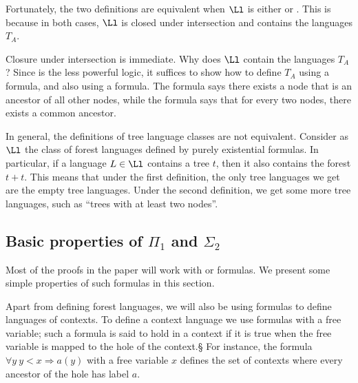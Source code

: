\documentclass{LMCS}
\begin{document}
Fortunately, the two  definitions are equivalent when $\Ll$ is either \Dtwo or \Dtwol. This is because in both cases,   $\Ll$ is closed under intersection and contains the languages  $T_A$.  

Closure under intersection is immediate. Why does $\Ll$ contain the languages $T_A$? Since \Dtwo is the less powerful logic, it suffices to show how to define $T_A$ using a \Stwo formula, and also using a \Ptwo formula. The \Stwo
formula says there exists a node that is an ancestor of all other
nodes, while the \Ptwo formula says that for every two nodes, there
exists a common ancestor. 

In general, the definitions of tree language classes are not equivalent. Consider as $\Ll$ the class of forest languages defined by purely existential formulas. In particular, if a language $L \in \Ll$ contains a tree $t$, then it also contains the forest $t+t$. This means that under the first definition, the only tree languages we get are the empty tree languages. Under the second definition, we get some more tree languages, such as ``trees with at least two nodes''.





\subsection{Basic properties of \texorpdfstring{$\Pi_1$}{Pi1} and  \texorpdfstring{$\Sigma_2$}{Sigma2}}
Most of the proofs in the paper will work with \Stwo or \Stwol formulas. We
present some simple properties of such formulas in this section.

Apart from defining forest languages, we will also be using formulas to define
languages of contexts. To define a context language we use formulas with a free
variable; such a formula is said to hold in a context if it is true when the
free variable is mapped to the hole of the context.§ For instance, the formula
$\forall y \ y < x \Rightarrow a(y)$ with a free variable $x$ defines the set
of contexts where every ancestor of the hole has label $a$.
\end{document}
